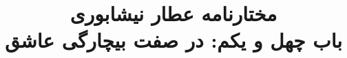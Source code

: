 \documentclass[14pt,b5paper]{article}
\begin{document}
\title{\Huge مختارنامه عطار نیشابوری \\
باب چهل و یکم: در صفت بیچارگی عاشق}
\author{ }
\date{ }
\maketitle
\newpage
\tableofcontents
\newpage

\newpage

\newpage

\newpage

\newpage

\newpage

\newpage

\newpage

\newpage

\newpage

\newpage

\newpage

\newpage

\newpage

\newpage

\newpage

\newpage

\newpage

\newpage

\newpage

\newpage

\newpage

\newpage

\newpage

\newpage

\newpage

\newpage

\newpage

\newpage

\newpage

\newpage

\newpage

\newpage

\newpage

\newpage

\newpage

\newpage

\newpage

\newpage

\newpage

\newpage
\end{document}
